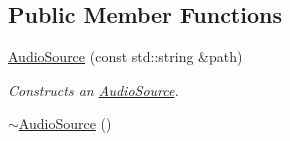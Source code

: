 \subsection*{Public Member Functions}
\begin{DoxyCompactItemize}
\item 
\hyperlink{classAudioSource_abcb925739a649c30663385a15d83af26}{Audio\+Source} (const std\+::string \&path)
\begin{DoxyCompactList}\small\item\em Constructs an \hyperlink{classAudioSource}{Audio\+Source}. \end{DoxyCompactList}\item 
\hypertarget{classAudioSource_a4d4b2be34ec676bf01d1ca1784f79a07}{\hyperlink{classAudioSource_a4d4b2be34ec676bf01d1ca1784f79a07}{$\sim$\+Audio\+Source} ()}\label{classAudioSource_a4d4b2be34ec676bf01d1ca1784f79a07}


\end{DoxyCompactItemize}
